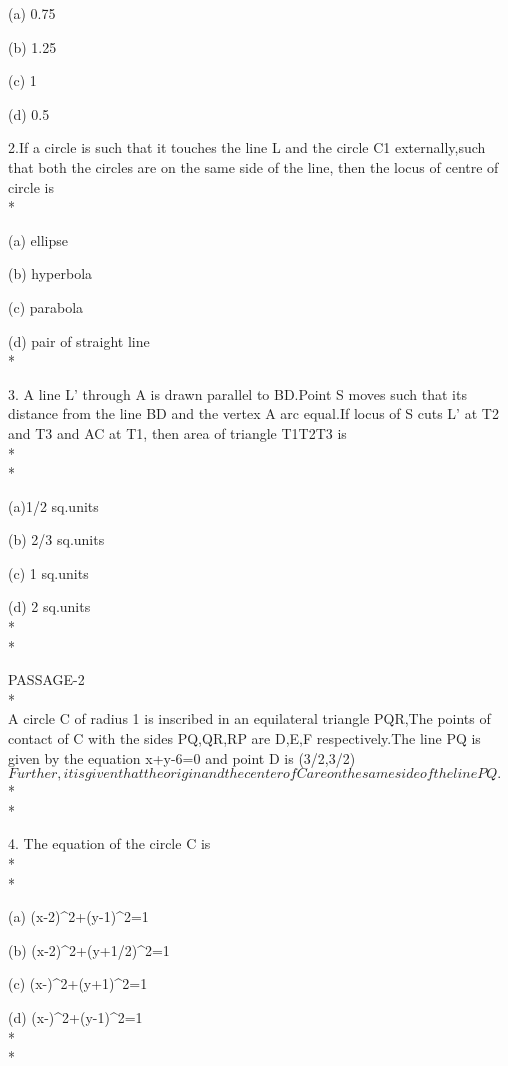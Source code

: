 \documentclass{article}
\begin{document}
\choice (a) 0.75

\choice (b) 1.25

\choice (c) 1

\choice (d) 0.5

2.If a circle is such that it touches the line L and the circle C1 externally,such that both the circles are on the same side of the line, then the locus of centre of circle is\\*

\choice (a) ellipse 

\choice (b) hyperbola

\choice (c) parabola

\choice (d) pair of straight line\\*

3. A line L' through A is drawn parallel to BD.Point S moves such that its distance from the line BD and the vertex A arc equal.If locus of S cuts L' at T2 and T3 and AC at T1, then area of triangle T1T2T3 is\\*\\*

\choice (a)1/2 sq.units

\choice (b) 2/3 sq.units

\choice (c) 1 sq.units

\choice (d) 2 sq.units\\*\\*

{\LARGE PASSAGE-2}\\*\\
 A circle C of radius 1 is inscribed in an equilateral triangle PQR,The points of contact of C with the sides PQ,QR,RP are D,E,F respectively.The line PQ is given by the equation  
x+y-6=0 \enspace and point D is (3/2,3/2) $Further,it is given that the origin and the center of C are on the same side of the line PQ.$\\*\\*

4. The equation of the circle C is \\*\\*

\choice (a) (x-2)^2+(y-1)^2=1

\choice (b) (x-2)^2+(y+1/2)^2=1

\choice (c) (x-)^2+(y+1)^2=1

\choice (d) (x-)^2+(y-1)^2=1\\*\\*
\end{document}
